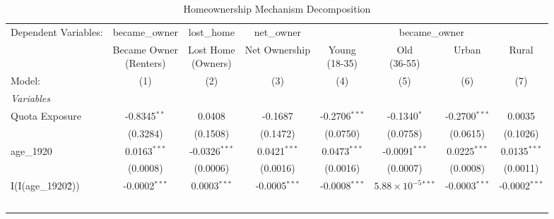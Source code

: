 
\begin{table}[htbp]
   \caption{\label{tab:ownermech} Homeownership Mechanism Decomposition}
   \centering
   \footnotesize
   \begin{adjustbox}{max width=\textwidth}
   \begin{tabular}{lccccccc}
      \tabularnewline \midrule \midrule
      Dependent Variables: & became\_owner & lost\_home & net\_owner & \multicolumn{4}{c}{became\_owner}\\
                           & \makecell{Became Owner\\(Renters)}    & \makecell{Lost Home\\(Owners)}    & Net Ownership           & \makecell{Young\\(18-35)}    & \makecell{Old\\(36-55)}       & Urban                   & Rural \\   
      Model:               & (1)                                   & (2)                               & (3)                     & (4)                          & (5)                           & (6)                     & (7)\\  
      \midrule
      \emph{Variables}\\
      Quota Exposure       & -0.8345$^{**}$                        & 0.0408                            & -0.1687                 & -0.2706$^{***}$              & -0.1340$^{*}$                 & -0.2700$^{***}$         & 0.0035\\   
                           & (0.3284)                              & (0.1508)                          & (0.1472)                & (0.0750)                     & (0.0758)                      & (0.0615)                & (0.1026)\\   
      age\_1920            & 0.0163$^{***}$                        & -0.0326$^{***}$                   & 0.0421$^{***}$          & 0.0473$^{***}$               & -0.0091$^{***}$               & 0.0225$^{***}$          & 0.0135$^{***}$\\   
                           & (0.0008)                              & (0.0006)                          & (0.0016)                & (0.0016)                     & (0.0007)                      & (0.0008)                & (0.0011)\\   
      I(I(age\_1920\^2))   & -0.0002$^{***}$                       & 0.0003$^{***}$                    & -0.0005$^{***}$         & -0.0008$^{***}$              & $5.88\times 10^{-5}$$^{***}$  & -0.0003$^{***}$         & -0.0002$^{***}$\\   
$$
\end{tabular}
\end{adjustbox}
\end{table}
